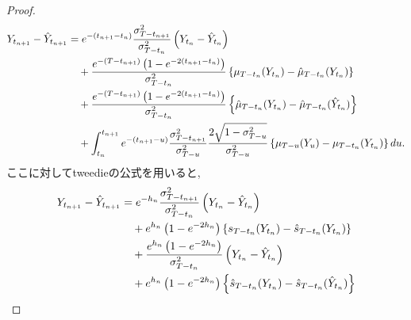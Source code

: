 \documentclass[11pt,a4paper]{ltjsarticle}
\theoremstyle{remark}
\begin{document}
\begin{proof}
    \begin{align}
        Y_{t_{n+1}}-\hat{Y}_{t_{n+1}}
        &=
        e^{-(t_{n+1}-t_n)}
        \frac{\sigma^2_{T-t_{n+1}}}{\sigma^2_{T-t_n}}
        \left(
            Y_{t_n}-\hat{Y}_{t_n}
        \right)
        \notag\\
        &\quad
        +
        \frac{
            e^{-(T-t_{n+1})}
            \left(
                1-e^{-2(t_{n+1}-t_n)}
            \right)
        }{
            \sigma^2_{T-t_n}
        }
        \left\{
            \mu_{T-t_n}(Y_{t_n})
            -
            \hat{\mu}_{T-t_n}(Y_{t_n})
        \right\}
        \notag\\
        &\quad
        +
        \frac{
            e^{-(T-t_{n+1})}
            \left(
                1-e^{-2(t_{n+1}-t_n)}
            \right)
        }{
            \sigma^2_{T-t_n}
        }
        \left\{
            \hat{\mu}_{T-t_n}(Y_{t_n})
            -
            \hat{\mu}_{T-t_n}(\hat{Y}_{t_n})
        \right\}
        \notag\\
        &\quad
        +
        \int_{t_n}^{t_{n+1}}
        e^{-(t_{n+1}-u)}
        \frac{\sigma^2_{T-t_{n+1}}}{\sigma^2_{T-u}}
        \frac{2\sqrt{1-\sigma^2_{T-u}}}{\sigma^2_{T-u}}
        \left\{
            \mu_{T-u}(Y_u)
            -
            \mu_{T-t_n}(Y_{t_n})
        \right\}
        du .
    \end{align}
    ここに対してtweedieの公式を用いると, 
    \begin{align}
        Y_{t_{n+1}}-\hat{Y}_{t_{n+1}}
        &=
        e^{-h_n}
        \frac{\sigma^2_{T-t_{n+1}}}{\sigma^2_{T-t_n}}
        \left(
            Y_{t_n}-\hat{Y}_{t_n}
        \right)
        \notag\\
        &\quad
        +
        e^{h_n}
        \left(
            1-e^{-2h_n}
        \right)
        \left\{
            s_{T-t_n}(Y_{t_n})
            -
            \hat{s}_{T-t_n}(Y_{t_n})
        \right\}
        \notag\\
        &\quad
        +
        \frac{
            e^{h_n}
            \left(
                1-e^{-2h_n}
            \right)
        }{
            \sigma^2_{T-t_n}
        }
        \left(
            Y_{t_n}-\hat{Y}_{t_n}
        \right)
        \notag\\
        &\quad
        +
        e^{h_n}
        \left(
            1-e^{-2h_n}
        \right)
        \left\{
            \hat{s}_{T-t_n}(Y_{t_n})
            -
            \hat{s}_{T-t_n}(\hat{Y}_{t_n})
        \right\}
        \notag\\

\end{align}
\end{proof}
\end{document}
